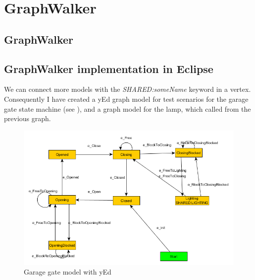 \chapter{GraphWalker}\label{sect:GraphWalker implementation of Garage Gate model}

\section{GraphWalker}

\section{GraphWalker implementation in Eclipse}

 We can connect more models with the \textit{SHARED:someName} keyword in a vertex. Consequently I have created a yEd graph model for test scenarios for the garage gate state machine (see ), and a graph model for the lamp, which called from the previous graph.

\begin{figure}[!ht]
	\centering
	\includegraphics[width=150mm, keepaspectratio]{figures/GateModel.png}
	\caption{Garage gate model with yEd}
	\label{fig:GateModel}
\end{figure}

